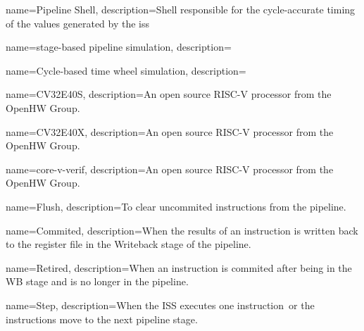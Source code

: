 



{
    name=Pipeline Shell,
    description=Shell responsible for the cycle-accurate timing of the values generated by the \acrshort{iss}
}

{
    name=stage-based pipeline simulation,
    description=
}

{
    name=Cycle-based time wheel simulation,
    description=
}

{
    name=CV32E40S,
    description=An open source RISC-V processor from the OpenHW Group.
}

{
    name=CV32E40X,
    description=An open source RISC-V processor from the OpenHW Group.
}

{
    name=core-v-verif,
    description=An open source RISC-V processor from the OpenHW Group.
}


{
    name=Flush,
    description=To clear uncommited instructions from the pipeline. 
}

{
    name=Commited,
    description=When the results of an instruction is written back to the register file in the Writeback stage of the pipeline.
}

{
    name=Retired,
    description=When an instruction is \gls{commited} after being in the WB stage and is no longer in the pipeline.
}

{
    name=Step,
    description=When the ISS executes one instruction\, or the instructions move to the next pipeline stage.
}



